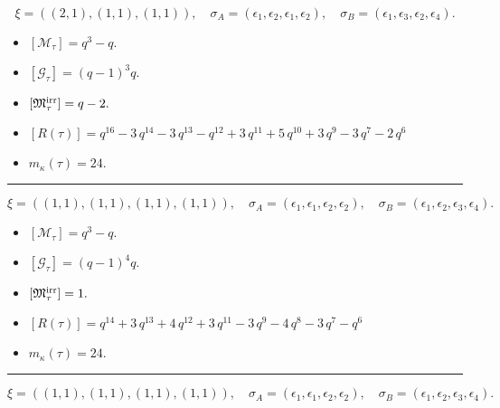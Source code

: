 \documentclass[10pt,a4paper]{amsart}
\begin{document}
$$\xi = ({(2, 1), (1, 1)}, {(1, 1)}),\quad \sigma_A = ({{\epsilon_1, \epsilon_2}, {\epsilon_1}}, {{\epsilon_2}}),\quad \sigma_B = ({{\epsilon_1, \epsilon_3}, {\epsilon_2}}, {{\epsilon_4}}).$$

\begin{itemize}
 \item $[\mathcal{M}_{\tau}] = q^{3} - q .$

 \item $[\mathcal{G}_{\tau}] = {\left(q - 1\right)}^{3} q .$

 \item $[{\frak M}_{\tau}^{\textrm{irr}}] = q - 2 .$

 \item $[R(\tau)] = q^{16} - 3 \, q^{14} - 3 \, q^{13} - q^{12} + 3 \, q^{11} + 5 \, q^{10} + 3 \, q^{9} - 3 \, q^{7} - 2 \, q^{6} $

 \item $m_{\kappa}(\tau) = 24 .$

 \end{itemize}
\noindent\rule{8cm}{0.4pt}

$$\xi = ({(1, 1), (1, 1), (1, 1)}, {(1, 1)}),\quad \sigma_A = ({{\epsilon_1}, {\epsilon_1}, {\epsilon_2}}, {{\epsilon_2}}),\quad \sigma_B = ({{\epsilon_1}, {\epsilon_2}, {\epsilon_3}}, {{\epsilon_4}}).$$

\begin{itemize}
 \item $[\mathcal{M}_{\tau}] = q^{3} - q .$

 \item $[\mathcal{G}_{\tau}] = {\left(q - 1\right)}^{4} q .$

 \item $[{\frak M}_{\tau}^{\textrm{irr}}] = 1 .$

 \item $[R(\tau)] = q^{14} + 3 \, q^{13} + 4 \, q^{12} + 3 \, q^{11} - 3 \, q^{9} - 4 \, q^{8} - 3 \, q^{7} - q^{6} $

 \item $m_{\kappa}(\tau) = 24 .$

 \end{itemize}
\noindent\rule{8cm}{0.4pt}

$$\xi = ({(1, 1), (1, 1)}, {(1, 1), (1, 1)}),\quad \sigma_A = ({{\epsilon_1}, {\epsilon_1}}, {{\epsilon_2}, {\epsilon_2}}),\quad \sigma_B = ({{\epsilon_1}, {\epsilon_2}}, {{\epsilon_3}, {\epsilon_4}}).$$
\end{document}
